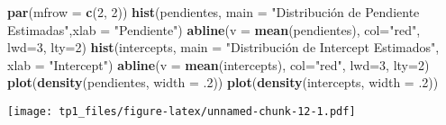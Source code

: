\documentclass[
]{article}
\newenvironment{Shaded}{\begin{snugshade}}{\end{snugshade}}
\newcommand{\AttributeTok}[1]{\textcolor[rgb]{0.13,0.29,0.53}{#1}}
\newcommand{\DecValTok}[1]{\textcolor[rgb]{0.00,0.00,0.81}{#1}}
\newcommand{\FunctionTok}[1]{\textcolor[rgb]{0.13,0.29,0.53}{\textbf{#1}}}
\newcommand{\NormalTok}[1]{#1}
\newcommand{\StringTok}[1]{\textcolor[rgb]{0.31,0.60,0.02}{#1}}
\begin{document}
\begin{Shaded}
\begin{Highlighting}[]
\FunctionTok{par}\NormalTok{(}\AttributeTok{mfrow =} \FunctionTok{c}\NormalTok{(}\DecValTok{2}\NormalTok{, }\DecValTok{2}\NormalTok{))}
\FunctionTok{hist}\NormalTok{(pendientes, }\AttributeTok{main =} \StringTok{"Distribución de Pendiente Estimadas"}\NormalTok{,}\AttributeTok{xlab =} \StringTok{"Pendiente"}\NormalTok{)}
\FunctionTok{abline}\NormalTok{(}\AttributeTok{v =} \FunctionTok{mean}\NormalTok{(pendientes), }\AttributeTok{col=}\StringTok{"red"}\NormalTok{, }\AttributeTok{lwd=}\DecValTok{3}\NormalTok{, }\AttributeTok{lty=}\DecValTok{2}\NormalTok{)}
\FunctionTok{hist}\NormalTok{(intercepts, }\AttributeTok{main =} \StringTok{"Distribución de Intercept Estimados"}\NormalTok{, }\AttributeTok{xlab =} \StringTok{"Intercept"}\NormalTok{)}
\FunctionTok{abline}\NormalTok{(}\AttributeTok{v =} \FunctionTok{mean}\NormalTok{(intercepts), }\AttributeTok{col=}\StringTok{"red"}\NormalTok{, }\AttributeTok{lwd=}\DecValTok{3}\NormalTok{, }\AttributeTok{lty=}\DecValTok{2}\NormalTok{)}
\FunctionTok{plot}\NormalTok{(}\FunctionTok{density}\NormalTok{(pendientes, }\AttributeTok{width =}\NormalTok{ .}\DecValTok{2}\NormalTok{))}
\FunctionTok{plot}\NormalTok{(}\FunctionTok{density}\NormalTok{(intercepts, }\AttributeTok{width =}\NormalTok{ .}\DecValTok{2}\NormalTok{))}
\end{Highlighting}
\end{Shaded}

\texttt{[image: tp1\_files/figure-latex/unnamed-chunk-12-1.pdf]}
\end{document}
